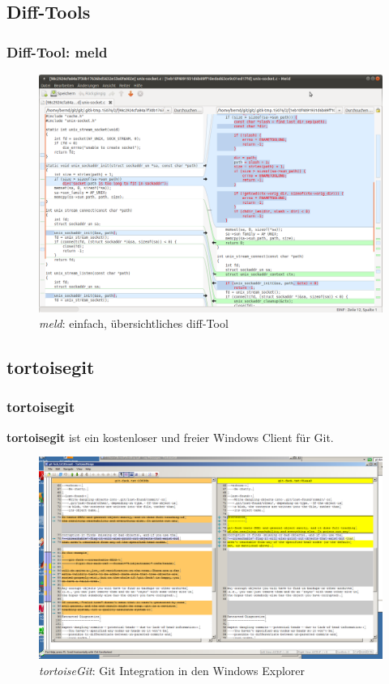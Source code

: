 \documentclass{beamer}
\begin{document}
\subsection{Diff-Tools}

\begin{frame}\frametitle{Diff-Tool: meld}

\begin{figure}
\includegraphics[scale=0.9]{Bilder/meld} 
\caption{\textit{meld}: einfach, übersichtliches diff-Tool}
\end{figure}
\end{frame}

\subsection{tortoisegit}

\begin{frame}\frametitle{tortoisegit}
\textbf{tortoisegit} ist ein kostenloser und freier Windows Client für Git.

\begin{figure}
\includegraphics[scale=0.9]{Bilder/tortoisegit} 
\caption{\textit{tortoiseGit}: Git Integration in den Windows Explorer}
\end{figure}
\end{frame}
\end{document}
